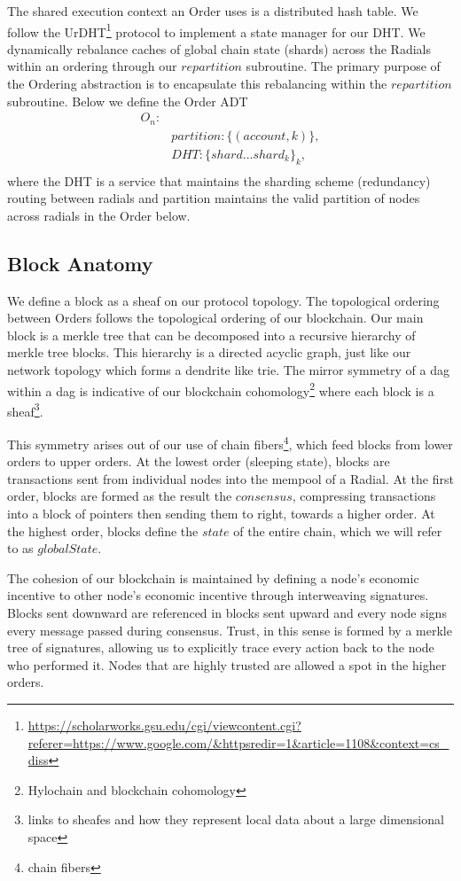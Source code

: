\documentclass{article}
\begin{document}
The shared execution context an Order uses is a distributed hash table. We follow the UrDHT\footnote{\url{https://scholarworks.gsu.edu/cgi/viewcontent.cgi?referer=https://www.google.com/&httpsredir=1&article=1108&context=cs_diss}} protocol to implement a state manager for our DHT. We dynamically rebalance caches of global chain state (shards) across the Radials within an ordering through our $repartition$ subroutine. The primary purpose of the Ordering abstraction is to encapsulate this rebalancing within the $repartition$ subroutine. Below we define the Order ADT
\begin{align*}
O_n: \\ &
partition:   \{(account, k)\}, \\ &
DHT: \{shard \dots shard_k\}_k, \\ &
\end{align*}
where the DHT is a service that maintains the sharding scheme (redundancy) routing between radials and partition maintains the valid partition of nodes across radials in the Order below.

\subsection{Block Anatomy}
We define a block as a sheaf on our protocol topology.
The topological ordering between Orders follows the topological ordering of our blockchain. Our main block is a merkle tree that can be decomposed into a recursive hierarchy of merkle tree blocks. This hierarchy is a directed acyclic graph, just like our network topology which forms a dendrite like trie. The mirror symmetry of a dag within a dag is indicative of our blockchain cohomology\footnote{Hylochain and blockchain cohomology} where each block is a sheaf\footnote{links to sheafes and how they represent local data about a large dimensional space}.

This symmetry arises out of our use of chain fibers\footnote{chain fibers}, which feed blocks from lower orders to upper orders. At the lowest order (sleeping state), blocks are transactions sent from individual nodes into the mempool of a Radial. At the first order, blocks are formed as the result the $consensus$, compressing transactions into a block of pointers then sending them to right, towards a higher order. At the highest order, blocks define the $state$ of the entire chain, which we will refer to as $globalState$. 

The cohesion of our blockchain is maintained by defining a node's economic incentive to other node's economic incentive through interweaving signatures. Blocks sent downward are referenced in blocks sent upward and every node signs every message passed during consensus. Trust, in this sense is formed by a merkle tree of signatures, allowing us to explicitly trace every action back to the node who performed it. Nodes that are highly trusted are allowed a spot in the higher orders.
\end{document}
